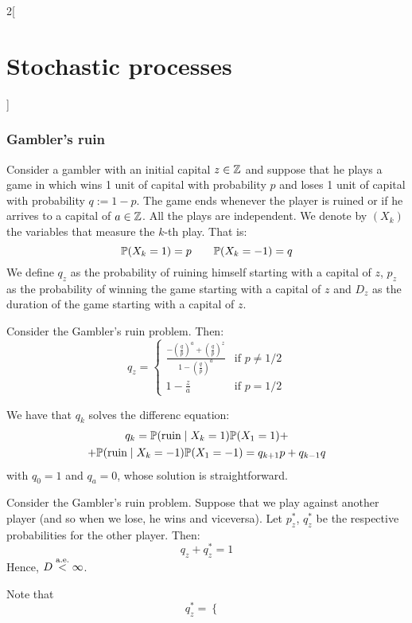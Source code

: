 \documentclass[../../../main_math.tex]{subfiles}
\begin{document}
\begin{multicols}{2}[\section{Stochastic processes}]
  \subsubsection{Gambler's ruin}
  \begin{definition}
    Consider a gambler with an initial capital $z\in\ZZ$ and suppose that he plays a game in which wins 1 unit of capital with probability $p$ and loses 1 unit of capital with probability $q:=1-p$. The game ends whenever the player is ruined or if he arrives to a capital of $a\in\ZZ$. All the plays are independent. We denote by $(X_k)$ the variables that measure the $k$-th play. That is: $$\Prob(X_k=1)=p\qquad\Prob(X_k=-1)=q$$
    We define $q_z$ as the probability of ruining himself starting with a capital of $z$, $p_z$ as the probability of winning the game starting with a capital of $z$ and $D_z$ as the duration of the game starting with a capital of $z$.
  \end{definition}
  \begin{proposition}
    Consider the Gambler's ruin problem. Then:
    $$q_z=\begin{cases}
        \frac{-{\left(\frac{q}{p}\right)}^a+{\left(\frac{q}{p}\right)}^z}{1-{\left(\frac{q}{p}\right)}^a} & \text{if $p\ne 1/2$} \\
        1-\frac{z}{a}                                                                                     & \text{if $p= 1/2$}
      \end{cases}$$
  \end{proposition}
  \begin{sproof}
    We have that $q_k$ solves the differenc equation:
    \begin{multline*}
      q_k =\mathbb{P}(\text{ruin}\mid X_k=1)\mathbb{P}(X_1=1)+\\
      +\mathbb{P}(\text{ruin}\mid X_k=-1)\mathbb{P}(X_1=-1) =q_{k+1}p+q_{k-1}q
    \end{multline*}
    with $q_0=1$ and $q_a=0$, whose solution is straightforward.
  \end{sproof}
  \begin{proposition}
    Consider the Gambler's ruin problem. Suppose that we play against another player (and so when we lose, he wins and viceversa). Let $p_z^*$, $q_z^*$ be the respective probabilities for the other player. Then:
    $$q_z+q_z^*=1$$
    Hence, $D\almoste{<}\infty$.
  \end{proposition}
  \begin{sproof}
    Note that
    $$q_z^*=\begin{cases}

\end{cases}$$
\end{sproof}
\end{multicols}
\end{document}
